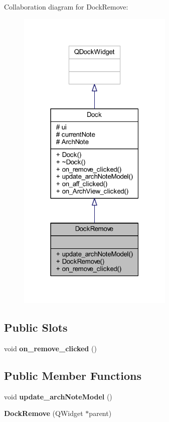 Collaboration diagram for Dock\+Remove\+:\nopagebreak
\begin{figure}[H]
\begin{center}
\leavevmode
\includegraphics[width=211pt]{class_dock_remove__coll__graph}
\end{center}
\end{figure}
\subsection*{Public Slots}
\begin{DoxyCompactItemize}
\item 
\mbox{\label{class_dock_remove_af674d9505592df25cd5b08328c0cdbd6}} 
void {\bfseries on\+\_\+remove\+\_\+clicked} ()
\end{DoxyCompactItemize}
\subsection*{Public Member Functions}
\begin{DoxyCompactItemize}
\item 
\mbox{\label{class_dock_remove_a4e653c9a21161b7d76c9cfd330579047}} 
void {\bfseries update\+\_\+arch\+Note\+Model} ()
\item 
\mbox{\label{class_dock_remove_aa2665bd1459600d9346029df9f2bba27}} 
{\bfseries Dock\+Remove} (Q\+Widget $\ast$parent)
\end{DoxyCompactItemize}
